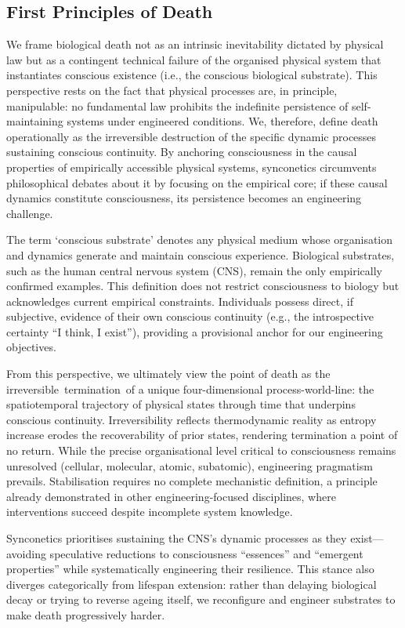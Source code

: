 \documentclass[10pt]{article}
\begin{document}
\begin{sloppypar}
  \subsection{First Principles of Death}
  \label{sec:first-principles}

  We frame biological death not as an intrinsic inevitability dictated by physical law but as a contingent technical failure of the organised physical system that instantiates conscious existence (i.e., the conscious biological substrate). This perspective rests on the fact that physical processes are, in principle, manipulable: no fundamental law prohibits the indefinite persistence of self-maintaining systems under engineered conditions. We, therefore, define death operationally as the irreversible destruction of the specific dynamic processes sustaining conscious continuity. By anchoring consciousness in the causal properties of empirically accessible physical systems, synconetics circumvents philosophical debates about it by focusing on the empirical core; if these causal dynamics constitute consciousness, its persistence becomes an engineering challenge.

  The term ‘conscious substrate’ denotes any physical medium whose organisation and dynamics generate and maintain conscious experience. Biological substrates, such as the human central nervous system (CNS), remain the only empirically confirmed examples. This definition does not restrict consciousness to biology but acknowledges current empirical constraints. Individuals possess direct, if subjective, evidence of their own conscious continuity (e.g., the introspective certainty “I think, I exist”), providing a provisional anchor for our engineering objectives.

  From this perspective, we ultimately view the point of death as the irreversible termination of a unique four-dimensional process-world-line: the spatiotemporal trajectory of physical states through time that underpins conscious continuity. Irreversibility reflects thermodynamic reality as entropy increase erodes the recoverability of prior states, rendering termination a point of no return. While the precise organisational level critical to consciousness remains unresolved (cellular, molecular, atomic, subatomic), engineering pragmatism prevails. Stabilisation requires no complete mechanistic definition, a principle already demonstrated in other engineering-focused disciplines, where interventions succeed despite incomplete system knowledge.

  Synconetics prioritises sustaining the CNS’s dynamic processes as they exist—avoiding speculative reductions to consciousness “essences” and “emergent properties” while systematically engineering their resilience. This stance also diverges categorically from lifespan extension: rather than delaying biological decay or trying to reverse ageing itself, we reconfigure and engineer substrates to make death progressively harder.


\end{sloppypar}
\end{document}

